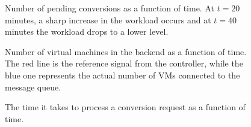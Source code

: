 \documentclass[a4paper, 10pt, english]{article}
\newlength\figureheight
\newlength\figurewidth
\begin{document}
\setlength{}
\setlength{}
\begin{figure}
	\centering
	
	\caption{Number of pending conversions as a function of time. At $ t=20 $ minutes, a sharp increase in the workload occurs and at $ t=40 $ minutes the workload drops to a lower level.}
	\label{fig:conversionsPending}
\end{figure}

\begin{figure}
	\centering
	
	\caption{Number of virtual machines in the backend as a function of time. The red line is the reference signal from the controller, while the blue one represents the actual number of VMs connected to the message queue. }
	\label{fig:numberOfVMs}
\end{figure}

\begin{figure}
	\centering
	
	\caption{The time it takes to process a conversion request as a function of time.}
	\label{fig:conversionTime}
\end{figure}
\end{document}
